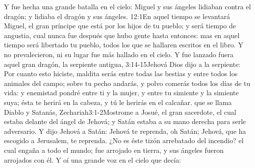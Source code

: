 Y fue hecha una grande batalla en el cielo: Miguel y sus ángeles lidiaban contra el dragón; y lidiaba el dragón y sus ángeles.%
					{12:1}{En aquel tiempo se levantará Miguel, el gran príncipe que está por los hijos de tu pueblo; y será tiempo de angustia, cual nunca fue después que hubo gente hasta entonces: mas en aquel tiempo será libertado tu pueblo, todos los que se hallaren escritos en el libro.}
Y no prevalecieron, ni su lugar fue más hallado en el cielo.%
Y fue lanzado fuera aquel gran dragón, la serpiente antigua,%
						{3:14-15}{Jehová Dios dijo a la serpiente: Por cuanto esto hiciste, maldita serás entre todas las bestias y entre todos los animales del campo; sobre tu pecho andarás, y polvo comerás todos los días de tu vida: y enemistad pondré entre ti y la mujer, y entre tu simiente y la simiente suya; ésta te herirá en la cabeza, y tú le herirás en el calcañar.}
 que se llama Diablo y Satanás,%
		{Zechariah}{3:1-2}{Mostrome a Josué, el gran sacerdote, el cual estaba delante del ángel de Jehová; y Satán estaba a su mano derecha para serle adversario. Y dijo Jehová a Satán: Jehová te reprenda, oh Satán; Jehová, que ha escogido a Jerusalem, te reprenda. ¿No es éste tizón arrebatado del incendio?}
 el cual engaña a todo el mundo; fue arrojado en tierra, y sus ángeles fueron arrojados con él. 
Y oí una grande voz en el cielo que decía:
